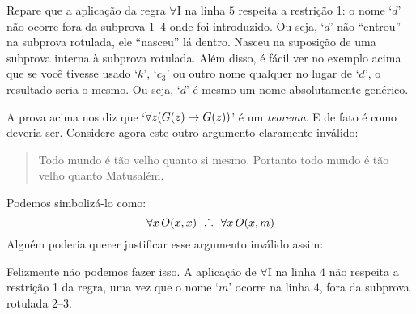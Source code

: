 \begin{fitchproof}
	\open
		\open
	     \close {}
	\close	{}
\end{fitchproof}
Repare que a aplicação da regra $\forall$I na linha $5$ respeita a restrição 1:
o nome `$d$' não ocorre fora da subprova $1$--$4$ onde foi introduzido.
Ou seja, `$d$' não ``entrou'' na subprova rotulada, ele ``nasceu'' lá dentro.
Nasceu na suposição de uma subprova interna à subprova rotulada. 
Além disso, é fácil ver no exemplo acima que se você tivesse usado `$k$', `$c_3$' ou outro nome qualquer no lugar de `$d$', o resultado seria o mesmo.
Ou seja, `$d$' é mesmo um nome absolutamente genérico.

A prova acima nos diz que `$\forall z (\mathord{G}(z) \rightarrow \mathord{G}(z))$' é um \emph{teorema}. E de fato é como deveria ser.
Considere agora este outro argumento claramente inválido:

	\begin{quote}
	Todo mundo é tão velho quanto si mesmo. Portanto todo mundo é tão velho quanto Matusalém.
	\end{quote}
Podemos simbolizá-lo como:
$$\forall x\,\mathord{O}(x,x) \ \mathrel{\ldotp\dot{}\,\ldotp} \ \forall x\,\mathord{O}(x,m)$$
Alguém poderia querer justificar esse argumento inválido assim:
\begin{fitchproof}
	\open
	\close {}	
\end{fitchproof}
Felizmente não podemos fazer isso. A aplicação de $\forall$I na linha $4$ não respeita a restrição 1 da regra, uma vez que o nome `$m$' ocorre na linha $4$, fora da subprova rotulada $2$--$3$.  


